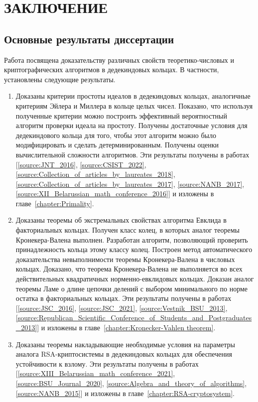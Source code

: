 \documentclass[_00_dissertation.tex]{subfiles}
\begin{document}
\onlyinsubfile{
    \renewcommand{\contentsname}{ОГЛАВЛЕНИЕ}
    \setcounter{tocdepth}{3}
    \tableofcontents
}

\chapter*{ЗАКЛЮЧЕНИЕ}

\section*{Основные результаты диссертации}

Работа посвящена доказательству различных свойств теоретико-числовых и криптографических алгоритмов в дедекиндовых кольцах.
В частности, установлены следующие результаты.
\begin{enumerate}
    \item Доказаны критерии простоты идеалов в дедекиндовых кольцах, аналогичные критериям Эйлера и Миллера в кольце целых чисел.
    Показано, что используя полученные критерии можно построить эффективный вероятностный алгоритм проверки идеала на простоту.
    Получены достаточные условия для дедекиндового кольца для того, чтобы этот алгоритм можно было модифицировать и сделать детерминированным.
    Получены оценки вычислительной сложности алгоритмов.
    Эти результаты получены в работах [\ref{source:JNT_2016}, \ref{source:CSIST_2022}, \ref{source:Collection_of_articles_by_laureates_2018}, \ref{source:Collection_of_articles_by_laureates_2017}, \ref{source:NANB_2017}, \ref{source:XII_Belarussian_math_conference_2016}] и изложены в главе~\ref{chapter:Primality}.

    \item Доказаны теоремы об экстремальных свойствах алгоритма Евклида в факториальных кольцах.
    Получен класс колец, в которых аналог теоремы Кронекера-Валена выполнен.
    Разработан алгоритм, позволяющий проверить принадлежность кольца этому классу колец.
    Построен метод автоматического доказательства невыполнимости теоремы Кронекера-Валена в числовых кольцах.
    Доказано, что теорема Кронекера-Валена не выполняется во всех действительных квадратичных норменно-евклидовых кольцах.
    Доказан аналог теоремы Ламе о длине цепочки делений с выбором минимального по норме остатка в факториальных кольцах.
    Эти результаты получены в работах [\ref{source:JSC_2016}, \ref{source:JSC_2021}, \ref{source:Vestnik_BSU_2013}, \ref{source:Republican_Scientific_Conference_of_Students_and_Postgraduates_2013}] и изложены в главе~\ref{chapter:Kronecker-Vahlen theorem}.

    \item Доказаны теоремы накладывающие необходимые условия на параметры аналога RSA-криптосистемы в дедекиндовых кольцах для обеспечения устойчивости к взлому.
    Эти результаты получены в работах [\ref{source:XIII_Belarussian_math_conference_2021}, \ref{source:BSU_Journal_2020}, \ref{source:Algebra_and_theory_of_algorithms}, \ref{source:NANB_2015}] и изложены в главе~\ref{chapter:RSA-cryptosystem}.
\end{enumerate}
\end{document}
